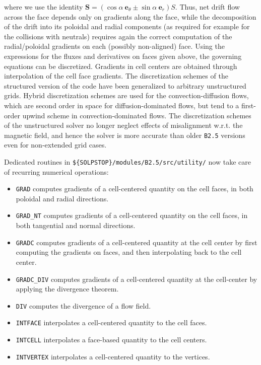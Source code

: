 where we use the identity $\mathbf{S} = \left( \cos \alpha \ \mathbf{e}_\theta \pm \sin \alpha \ \mathbf{e}_r \right) S$.
Thus, net drift flow
across the face depends only on gradients along the face, while the
decomposition of the drift into its poloidal and radial components (as
required for example for the collisions with neutrals) requires again the
correct computation of the radial/poloidal gradients on each (possibly
non-aligned) face.
Using the expressions for the fluxes and derivatives on faces given
above, the governing equations can be discretized. Gradients in cell
centers are obtained through interpolation of the cell face gradients.
The discretization schemes of the structured version of the code have
been generalized to arbitrary unstructured grids. Hybrid discretization
schemes are used for the convection-diffusion flows, which are second
order in space for diffusion-dominated flows, but tend to a first-order
upwind scheme in convection-dominated flows.
The discretization schemes of the unstructured solver no longer neglect effects of misalignment
w.r.t. the magnetic field, and hence the solver is more accurate than older {\tt B2.5} versions
 even for non-extended grid cases.

Dedicated routines in {\tt \$\{SOLPSTOP\}/modules/B2.5/src/utility/} now take care of recurring numerical operations:

\begin{itemize}
\item {\tt GRAD} computes gradients of a cell-centered quantity on the cell faces, in both poloidal and radial directions.
\item {\tt GRAD\_NT} computes gradients of a cell-centered quantity on the cell faces, in both tangential and normal directions.
\item {\tt GRADC} computes gradients of a cell-centered quantity at the cell center by first computing the gradients on faces, and then interpolating back to the cell center.
\item {\tt GRADC\_DIV} computes gradients of a cell-centered quantity at the cell-center by applying the divergence theorem.
\item {\tt DIV} computes the divergence of a flow field.
\item {\tt INTFACE} interpolates a cell-centered quantity to the cell faces.
\item {\tt INTCELL} interpolates a face-based quantity to the cell centers.
\item {\tt INTVERTEX} interpolates a cell-centered quantity to the vertices.
\end{itemize}

